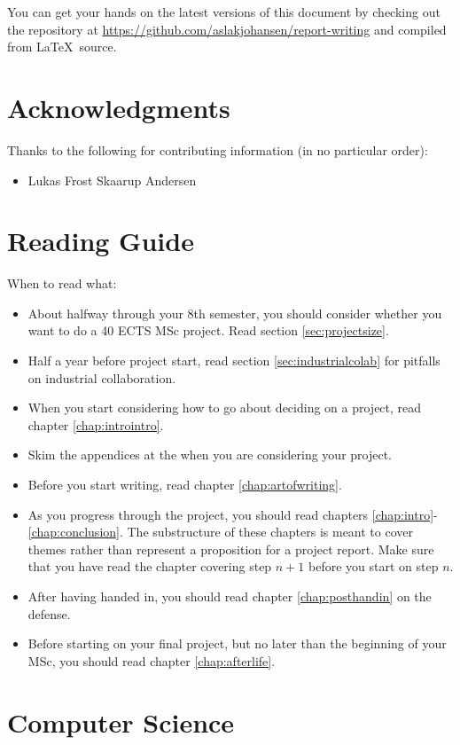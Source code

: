 \documentclass[a4paper, oneside]{memoir}
\begin{document}
You can get your hands on the latest versions of this document by checking out the repository at \url{https://github.com/aslakjohansen/report-writing} and compiled from \LaTeX\ source.

\section{Acknowledgments}

Thanks to the following for contributing information (in no particular order):
\begin{itemize}
  \item Lukas Frost Skaarup Andersen %
\end{itemize}

\section{Reading Guide}

When to read what:
\begin{itemize}
  \item About halfway through your 8th semester, you should consider whether you want to do a 40 ECTS MSc project. Read section \ref{sec:projectsize}.
  \item Half a year before project start, read section \ref{sec:industrialcolab} for pitfalls on industrial collaboration.
  \item When you start considering how to go about deciding on a project, read chapter \ref{chap:introintro}.
  \item Skim the appendices at the when you are considering your project.
  \item Before you start writing, read chapter \ref{chap:artofwriting}.
  \item As you progress through the project, you should read chapters \ref{chap:intro}-\ref{chap:conclusion}. The substructure of these chapters is meant to cover themes rather than represent a proposition for a project report. Make sure that you have read the chapter covering step $n+1$ before you start on step $n$.
  \item After having handed in, you should read chapter \ref{chap:posthandin} on the defense.
  \item Before starting on your final project, but no later than the beginning of your MSc, you should read chapter \ref{chap:afterlife}.
\end{itemize}

\section{Computer Science}
\end{document}
